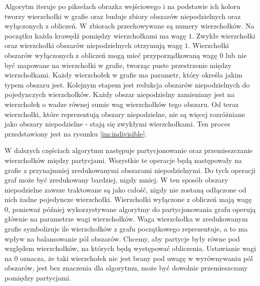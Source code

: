 Algorytm iteruje po pikselach obrazka wejściowego i na podstawie ich koloru tworzy wierzchołki w grafie oraz buduje zbiory
obszarów niepodzielnych oraz wyłączonych z obliczeń.
W zbiorach przechowywane są numery wierzchołków.
Na początku każda krawędź pomiędzy wierzchołkami ma wagę $1$.
Zwykłe wierzchołki oraz wierzchołki obszarów niepodzielnych otrzymują wagę $1$.
Wierzchołki obszarów wyłączonych z obliczeń mogą mieć przyporządkowaną wagę $0$ lub nie być mapowane na wierzchołki w grafie,
tworząc puste przestrzenie między wierzchołkami.
Każdy wierzchołek w grafie ma parametr, który określa jakim typem obszaru jest.
Kolejnym etapem jest redukcja obszarów niepodzielnych do pojedynczych wierzchołków.
Każdy obszar niepodzielny zamieniany jest na wierzchołek o wadze równej sumie wag wierzchołków tego obszaru.
Od teraz wierzchołki, które reprezentują obszary niepodzielne, nie są więcej rozróżniane jako obszary niepodzielne -
stają się zwykłymi
wierzchołkami.
Ten proces przedstawiony jest na rysunku \ref{im:indivisible}.

W dalszych częściach algorytmu następuje partycjonowanie oraz przemieszczanie wierzchołków między partycjami.
Wszystkie te operacje będą następowały na grafie z przynajmniej zredukowanymi obszarami niepodzielnymi.
Do tych operacji graf może być zredukowany bardziej, nigdy mniej.
W ten sposób obszary niepodzielne zawsze traktowane są jako całość, nigdy nie zostaną odłączone od nich żadne pojedyncze
wierzchołki.
Wierzchołki wyłączone z obliczeń mają wagę $0$, ponieważ później wykorzystywane algorytmy do partycjonowania grafu operują
głównie na parametrze wagi wierzchołków.
Waga wierzchołka w zredukowanym grafie symbolizuje ile wierzchołków z grafu początkowego reprezentuje, a to ma wpływ
na balansowanie pól obszarów.
Chcemy, aby partycje były równe pod względem wierzchołków, na których będą występować obliczenia.
Ustawianie wagi na $0$ oznacza, że taki wierzchołek nie jest brany pod uwagę w wyrównywaniu pól obszarów, jest
bez znaczenia dla algorytmu, może być dowolnie przemieszczany pomiędzy partycjami.

\vspace{8mm}

